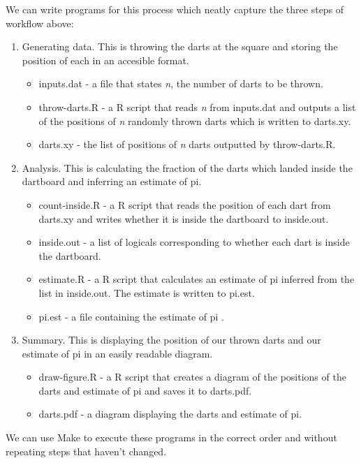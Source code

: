 \documentclass[12pt]{article}\usepackage[]{graphicx}\usepackage[]{color}
\begin{document}
We can write programs for this process which neatly capture the three steps of workflow above:
\begin{enumerate}
  \item Generating data. This is throwing the darts at the square and storing the position of each in an accesible format.
  \begin{itemize}
    \item inputs.dat - a file that states \emph{n}, the number of darts to be thrown.
    \item throw-darts.R - a R script that reads \emph{n} from inputs.dat and outputs a list of the positions of \emph{n} randomly thrown darts which is written to darts.xy.
    \item darts.xy - the list of positions of \emph{n} darts outputted by throw-darts.R.
  \end{itemize}
  \item Analysis. This is calculating the fraction of the darts which landed inside the dartboard and inferring an estimate of pi.
  \begin{itemize}
    \item count-inside.R - a R script that reads the position of each dart from darts.xy and writes whether it is inside the dartboard to inside.out.
    \item inside.out - a list of logicals corresponding to whether each dart is inside the dartboard.
    \item estimate.R - a R script that calculates an estimate of pi inferred from the list in inside.out. The estimate is written to pi.est.
    \item pi.est - a file containing the estimate of pi .
  \end{itemize}
  \item Summary. This is displaying the position of our thrown darts and our estimate of pi in an easily readable diagram.
  \begin{itemize}
    \item draw-figure.R - a R script that creates a diagram of the positions of the darts and estimate of pi and saves it to darts.pdf.
    \item darts.pdf - a diagram displaying the darts and estimate of pi.
  \end{itemize}
\end{enumerate}

We can use Make to execute these programs in the correct order and without repeating steps that haven't changed.
\end{document}
